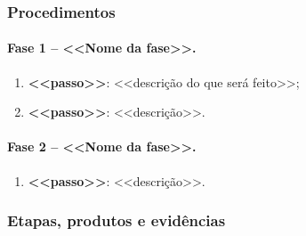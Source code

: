 \subsubsection{Procedimentos}

\paragraph{Fase 1 -- <<Nome da fase>>.}
\begin{enumerate}[label=\alph*)]
  \item \textbf{<<passo>>}: <<descrição do que será feito>>;
  \item \textbf{<<passo>>}: <<descrição>>.
\end{enumerate}

\paragraph{Fase 2 -- <<Nome da fase>>.}
\begin{enumerate}[label=\alph*), resume]
  \item \textbf{<<passo>>}: <<descrição>>.
\end{enumerate}

%   

\subsubsection{Etapas, produtos e evidências}

